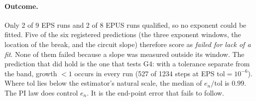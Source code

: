 \documentclass[aps,pra,reprint,superscriptaddress,nofootinbib]{revtex4-2}
\newcommand{\tol}{\mathrm{tol}}
\begin{document}
\paragraph*{Outcome.} Only 2 of 9 EPS runs and 2 of 8 EPUS runs qualified, so no exponent
could be fitted. Five of the six registered predictions (the three exponent windows, the
location of the break, and the circuit slope) therefore score as \emph{failed for lack of a
fit}. None of them failed because a slope was measured outside its window. The prediction
that did hold is the one that tests G4: with a tolerance separate from the band, growth $<1$
occurs in every run (527 of 1234 steps at EPS $\tol=10^{-6}$). Where $\tol$ lies below the
estimator's natural scale, the median of $e_n/\tol$ is $0.99$. The PI law does control
$e_n$. It is the end-point error that fails to follow.
\end{document}
